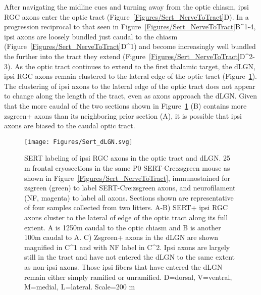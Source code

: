 After navigating the midline cues and turning away from the optic chiasm, ipsi RGC axons enter the optic tract (Figure~\ref{Figures/Sert_NerveToTract}D).
In a progression reciprocal to that seen in Figure~\ref{Figures/Sert_NerveToTract}B^{1-4}, ipsi axons are loosely bundled just caudal to the chiasm (Figure~\ref{Figures/Sert_NerveToTract}D^1) and become increasingly well bundled the further into the tract they extend (Figure~\ref{Figures/Sert_NerveToTract}D^{2-3}).
As the optic tract continues to extend to the first thalamic target, the dLGN, ipsi RGC axons remain clustered to the lateral edge of the optic tract (Figure~\ref{Figures/Sert_dLGN}).
The clustering of ipsi axons to the lateral edge of the optic tract does not appear to change along the length of the tract, even as axons approach the dLGN.
Given that the more caudal of the two sections shown in Figure~\ref{Figures/Sert_dLGN} (B) contains more zsgreen+ axons than its neighboring prior section (A), it is possible that ipsi axons are biased to the caudal optic tract.

\begin{figure}[hbtp]
	\begin{center}
		\texttt{[image: Figures/Sert\_dLGN.svg]}
		\caption[SERT labeling of ipsi RGC axons in the optic tract and dLGN.]
		{SERT labeling of ipsi RGC axons in the optic tract and dLGN.
		25 \mu m frontal cryosections in the same P0 SERT-Cre:zsgreen mouse as shown in Figure~\ref{Figures/Sert_NerveToTract}, immunostained for zsgreen (green) to label SERT-Cre:zsgreen axons, and neurofilament (NF, magenta) to label all axons.
		Sections shown are representative of four samples collected from two litters. %
		A-B) SERT+ ipsi RGC axons cluster to the lateral of edge of the optic tract along its full extent. 
		A is 1250\mu m caudal to the optic chiasm and B is another 100\mu m caudal to A.
		C) Zsgreen+ axons in the dLGN are shown magnified in C^1 and with NF label in C^2.
		Ipsi axons are largely still in the tract and have not entered the dLGN to the same extent as non-ipsi axons.
		Those ipsi fibers that have entered the dLGN remain either simply ramified or unramified.
		D=dorsal, V=ventral, M=medial, L=lateral. Scale=200 \mu m}
		\label{Figures/Sert_dLGN}
	\end{center}
\end{figure}